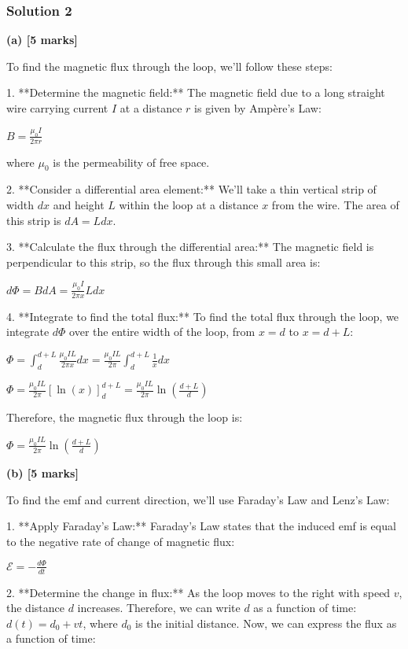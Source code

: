 \documentclass{article}
\begin{document}
\subsubsection{Solution 2}
\textbf{(a) [5 marks]}

To find the magnetic flux through the loop, we'll follow these steps:

1. **Determine the magnetic field:** The magnetic field due to a long straight wire carrying current $I$ at a distance $r$ is given by Ampère's Law:
   
   $B = \frac{\mu_0 I}{2 \pi r}$

   where $\mu_0$ is the permeability of free space.

2. **Consider a differential area element:**  We'll take a thin vertical strip of width $dx$ and height $L$ within the loop at a distance $x$ from the wire. The area of this strip is $dA = L dx$.

3. **Calculate the flux through the differential area:** The magnetic field is perpendicular to this strip, so the flux through this small area is:

   $d\Phi = B dA = \frac{\mu_0 I}{2 \pi x} L dx$

4. **Integrate to find the total flux:** To find the total flux through the loop, we integrate $d\Phi$ over the entire width of the loop, from $x = d$ to $x = d + L$:

   $\Phi = \int_{d}^{d+L} \frac{\mu_0 I L}{2 \pi x} dx = \frac{\mu_0 I L}{2 \pi} \int_{d}^{d+L} \frac{1}{x} dx$

   $\Phi = \frac{\mu_0 I L}{2 \pi} \left[ \ln(x) \right]_{d}^{d+L} = \frac{\mu_0 I L}{2 \pi} \ln \left( \frac{d+L}{d} \right)$

Therefore, the magnetic flux through the loop is:

$\boxed{\Phi = \frac{\mu_0 I L}{2 \pi} \ln \left( \frac{d+L}{d} \right)}$


\textbf{(b) [5 marks]}

To find the emf and current direction, we'll use Faraday's Law and Lenz's Law:

1. **Apply Faraday's Law:** Faraday's Law states that the induced emf is equal to the negative rate of change of magnetic flux:

   $\mathcal{E} = -\frac{d\Phi}{dt}$

2. **Determine the change in flux:** As the loop moves to the right with speed $v$, the distance $d$ increases.  Therefore, we can write $d$ as a function of time: $d(t) = d_0 + vt$, where $d_0$ is the initial distance. Now, we can express the flux as a function of time:
\end{document}

